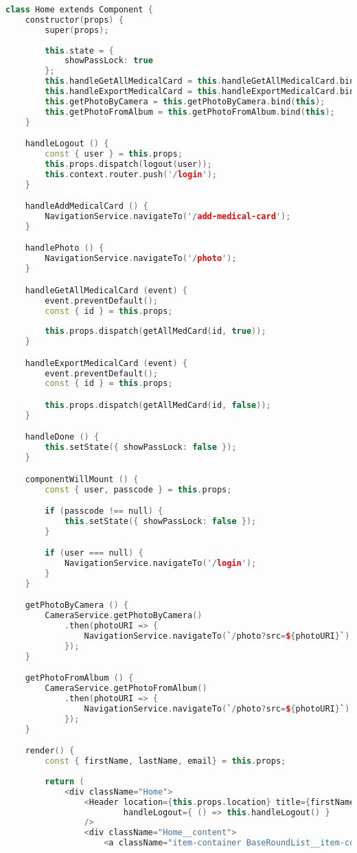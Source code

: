 \begin{lstlisting}[language=C++, style=cplusplusstyle]
class Home extends Component {
    constructor(props) {
        super(props);
        
        this.state = {
            showPassLock: true
        };
        this.handleGetAllMedicalCard = this.handleGetAllMedicalCard.bind(this);
        this.handleExportMedicalCard = this.handleExportMedicalCard.bind(this);
        this.getPhotoByCamera = this.getPhotoByCamera.bind(this);
        this.getPhotoFromAlbum = this.getPhotoFromAlbum.bind(this);
    }

    handleLogout () {
        const { user } = this.props;
        this.props.dispatch(logout(user));
        this.context.router.push('/login');
    }

    handleAddMedicalCard () {
        NavigationService.navigateTo('/add-medical-card');
    }

    handlePhoto () {
        NavigationService.navigateTo('/photo');
    }

    handleGetAllMedicalCard (event) {
        event.preventDefault();
        const { id } = this.props;
        
        this.props.dispatch(getAllMedCard(id, true));
    }

    handleExportMedicalCard (event) {
        event.preventDefault();
        const { id } = this.props;

        this.props.dispatch(getAllMedCard(id, false));
    }

    handleDone () {
        this.setState({ showPassLock: false });
    }

    componentWillMount () {
        const { user, passcode } = this.props;

        if (passcode !== null) {
            this.setState({ showPassLock: false });
        }

        if (user === null) {
            NavigationService.navigateTo('/login');
        }
    }

    getPhotoByCamera () {
        CameraService.getPhotoByCamera()
            .then(photoURI => {
                NavigationService.navigateTo(`/photo?src=${photoURI}`);
            });
    }

    getPhotoFromAlbum () {
        CameraService.getPhotoFromAlbum()
            .then(photoURI => {
                NavigationService.navigateTo(`/photo?src=${photoURI}`);
            });
    }

    render() {
        const { firstName, lastName, email} = this.props;
        
        return (
            <div className="Home">
                <Header location={this.props.location} title={firstName} isMainPage={true}
                        handleLogout={ () => this.handleLogout() }
                />
                <div className="Home__content">
                    <a className="item-container BaseRoundList__item-container--1" onClick={this.handleGetAllMedicalCard}> <p> Get All Card</p></a>


\end{lstlisting}
